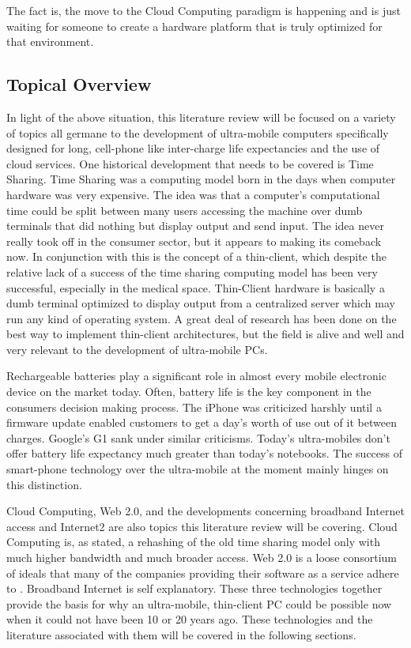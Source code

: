 \documentclass[12pt,oneside,letterpaper]{article}
\begin{document}
The fact is, the move to the Cloud Computing paradigm is happening and is just
waiting for someone to create a hardware platform that is truly optimized for
that environment.

\subsection{Topical Overview}

In light of the above situation, this literature review will be focused on a
variety of topics all germane to the development of ultra-mobile computers
specifically designed for long, cell-phone like inter-charge life expectancies
and the use of cloud services.  One historical development that needs to be
covered is Time Sharing.  Time Sharing was a computing model born in the days
when computer hardware was very expensive.  The idea was that a computer's
computational time could be split between many users accessing the machine over
dumb terminals that did nothing but display output and send input.  The idea
never really took off in the consumer sector, but it appears to making its
comeback now.  In conjunction with this is the concept of a thin-client, which
despite the relative lack of a success of the time sharing computing model has
been very successful, especially in the medical space.  Thin-Client hardware is
basically a dumb terminal optimized to display output from a centralized server
which may run any kind of operating system.  A great deal of research has been
done on the best way to implement thin-client architectures, but the field is
alive and well and very relevant to the development of ultra-mobile PCs.

Rechargeable batteries play a significant role in almost every mobile electronic
device on the market today.  Often, battery life is the key component in the
consumers decision making process.  The iPhone was criticized harshly until a
firmware update enabled customers to get a day's worth of use out of it between
charges.  Google's G1 sank under similar criticisms.  Today's ultra-mobiles
don't offer battery life expectancy much greater than today's notebooks.  The
success of smart-phone technology over the ultra-mobile at the moment mainly
hinges on this distinction.

Cloud Computing, Web 2.0, and the developments concerning broadband Internet
access and Internet2 are also topics this literature review will be covering.
Cloud Computing is, as stated, a rehashing of the old time sharing model only
with much higher bandwidth and much broader access.  Web 2.0 is a loose
consortium of ideals that many of the companies providing their software as a
service adhere to \citep{oreilly2007}.  Broadband Internet is self explanatory.
These three technologies together provide the basis for why an ultra-mobile,
thin-client PC could be possible now when it could not have been 10 or 20 years
ago.  These technologies and the literature associated with them will be covered
in the following sections.
\end{document}
